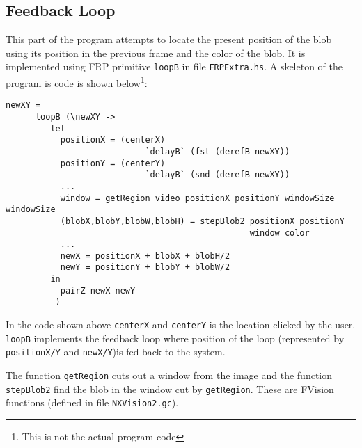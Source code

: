 \documentclass[12pt]{article}
\begin{document}
\subsection{Feedback Loop}
\par This part of the program attempts to locate the present position of the blob using its position in the previous frame and the color of the blob. It is implemented using FRP primitive {\tt loopB} in file {\tt FRPExtra.hs}. A skeleton of the program is code is shown below\footnote{This is not the actual program code}:
\begin{verbatim}
newXY = 
      loopB (\newXY ->
         let
           positionX = (centerX) 
                            `delayB` (fst (derefB newXY))
           positionY = (centerY) 
                            `delayB` (snd (derefB newXY))
           ...
           window = getRegion video positionX positionY windowSize windowSize
           (blobX,blobY,blobW,blobH) = stepBlob2 positionX positionY 
                                                 window color
           ...
           newX = positionX + blobX + blobH/2
           newY = positionY + blobY + blobW/2
         in
           pairZ newX newY
          )
\end{verbatim}
\par In the code shown above {\tt centerX} and {\tt centerY} is the location clicked by the user. {\tt loopB} implements the feedback loop where position of the loop (represented by {\tt positionX/Y} and {\tt newX/Y})is fed back to the system.
\par The function {\tt getRegion} cuts out a window from the image and the function {\tt stepBlob2} find the blob in the window cut by {\tt getRegion}. These are FVision functions (defined in file {\tt NXVision2.gc}).
\end{document}

